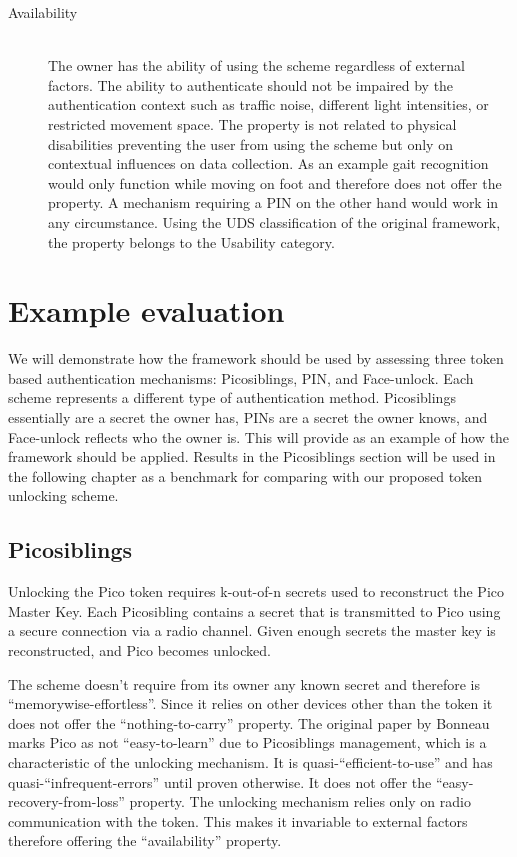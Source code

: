 \begin{description}
  \item[Availability] \hfill \\
  The owner has the ability of using the scheme regardless of external factors. The ability to authenticate should not be impaired by the authentication context such as traffic noise, different light intensities, or restricted movement space. The property is not related to physical disabilities preventing the user from using the scheme but only on contextual influences on data collection. As an example gait recognition would only function while moving on foot and therefore does not offer the property. A mechanism requiring a PIN on the other hand would work in any circumstance. Using the UDS classification of the original framework, the property belongs to the Usability category.
  
\end{description}

\section{Example evaluation}
We will demonstrate how the framework should be used by assessing three token based authentication mechanisms: Picosiblings, PIN, and Face-unlock. Each scheme represents a different type of authentication method. Picosiblings essentially are a secret the owner has, PINs are a secret the owner knows, and Face-unlock reflects who the owner is. This will provide as an example of how the framework should be applied. Results in the Picosiblings section will be used in the following chapter as a benchmark for comparing with our proposed token unlocking scheme.

	\subsection{Picosiblings}
	Unlocking the Pico token requires k-out-of-n secrets used to reconstruct the Pico Master Key. Each Picosibling contains a secret that is transmitted to Pico using a secure connection via a radio channel. Given enough secrets the master key is reconstructed, and Pico becomes unlocked.
	
	The scheme doesn't require from its owner any known secret and therefore is ``memorywise-effortless''. Since it relies on other devices other than the token it does not offer the ``nothing-to-carry'' property. The original paper by Bonneau marks Pico as not ``easy-to-learn'' due to Picosiblings management, which is a characteristic of the unlocking mechanism. It is quasi-``efficient-to-use'' and has quasi-``infrequent-errors'' until proven otherwise. It does not offer the ``easy-recovery-from-loss'' property. The unlocking mechanism relies only on radio communication with the token. This makes it invariable to external factors therefore offering the ``availability'' property.
	

